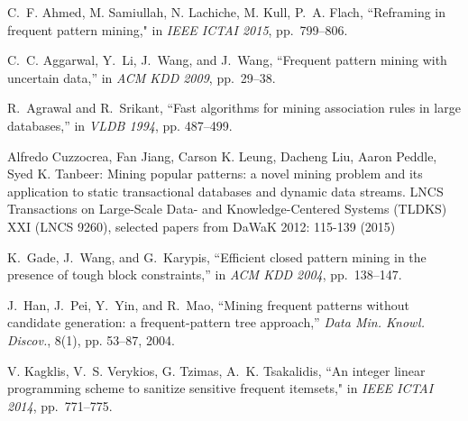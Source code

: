 \documentclass[10pt, conference, compsocconf]{IEEEtran}
\begin{document}
%
%
\begin{thebibliography}{10}
\setlength{\itemsep}{1mm}

 C.~F. Ahmed, M. Samiullah, N. Lachiche, M. Kull, P.~A. Flach, ``Reframing in frequent pattern mining," in {\em IEEE ICTAI 2015}, pp.~799--806.

C.~C. Aggarwal, Y.~Li, J.~Wang, and J.~Wang, ``Frequent pattern mining with
  uncertain data,'' in \emph{ACM KDD 2009}, pp.~29--38.

R.~Agrawal and R.~Srikant, ``Fast algorithms for mining association rules in
  large databases,'' in \emph{VLDB 1994}, pp. 487--499.

 Alfredo Cuzzocrea, Fan Jiang, Carson K. Leung, Dacheng Liu, Aaron Peddle, Syed K. Tanbeer: Mining popular patterns: a novel mining problem and its application to static transactional databases and dynamic data streams. LNCS Transactions on Large-Scale Data- and Knowledge-Centered Systems (TLDKS) XXI (LNCS 9260), selected papers from DaWaK 2012: 115-139 (2015)

K.~Gade, J.~Wang, and G.~Karypis, ``Efficient closed pattern mining in the
  presence of tough block constraints,'' in \emph{ACM KDD 2004}, pp.~138--147.

J.~Han, J.~Pei, Y.~Yin, and R.~Mao, ``Mining frequent patterns without
  candidate generation: a frequent-pattern tree approach,'' \emph{Data Min.
  Knowl. Discov.}, 8(1), pp. 53--87, 2004.

 V. Kagklis, V.~S. Verykios, G. Tzimas, A.~K. Tsakalidis, ``An integer linear programming scheme to sanitize sensitive frequent itemsets," in {\em IEEE ICTAI 2014}, pp.~771--775.


\end{thebibliography}
\end{document}

